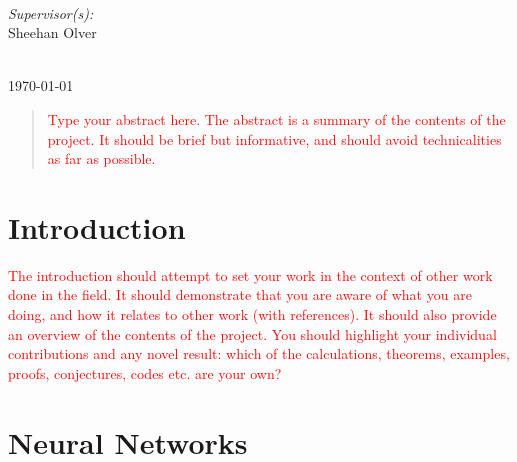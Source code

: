 \documentclass[a4paper,11pt, titlepage]{article}
\theoremstyle{definition}
\theoremstyle{plain}
\theoremstyle{remark}
\newcommand{\supervisor}{Sheehan Olver} %
\begin{document}
\begin{titlepage}
\begin{minipage}{0.4\textwidth}
\end{minipage}
~
\begin{minipage}{0.4\textwidth}
\begin{flushright} \large
\emph{Supervisor(s):} \\
\supervisor %
\end{flushright}
\end{minipage}\\[2cm]
\makeatother
\vfill
\makeatletter
{\large \today}\\[2cm] %
\makeatother
\end{titlepage}

\begin{abstract}
\textcolor{red}{Type your abstract here. The abstract is a summary of the contents of the project. It should be brief but informative, and
should avoid technicalities as far as possible.}
\end{abstract}
 
\tableofcontents
\clearpage

\section{Introduction}
\label{sec:introduction}

\textcolor{red}{The introduction should attempt to set your work in the context of other work done in the field. It
should demonstrate that you are aware of what you are doing, and how it relates to other work
(with references). It should also provide an overview of the contents of the project. You should
highlight your individual contributions and any novel result: which of the calculations, theorems,
examples, proofs, conjectures, codes etc. are your own?}

\section{Neural Networks}
\end{document}
